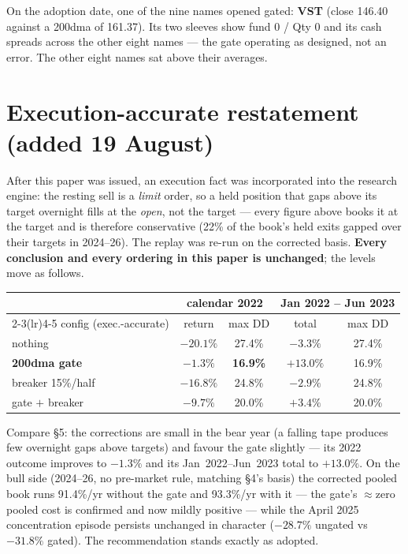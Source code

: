\documentclass[11pt,a4paper]{article}
\newcommand{\tabnote}[1]{\begin{center}\begin{minipage}{0.92\textwidth}
  \footnotesize\color{bcgrey}#1\end{minipage}\end{center}}
\newcommand{\good}[1]{{\color{bcteal}\textbf{#1}}}
\begin{document}
On the adoption date, one of the nine names opened gated: \textbf{VST} (close
146.40 against a 200dma of 161.37). Its two sleeves show fund 0 / Qty 0 and its
cash spreads across the other eight names --- the gate operating as designed, not
an error. The other eight names sat above their averages.

\section{Execution-accurate restatement (added 19 August)}

After this paper was issued, an execution fact was incorporated into the
research engine: the resting sell is a \emph{limit} order, so a held position
that gaps above its target overnight fills at the \emph{open}, not the target
--- every figure above books it at the target and is therefore conservative
(22\% of the book's held exits gapped over their targets in 2024--26). The
replay was re-run on the corrected basis. \textbf{Every conclusion and every
ordering in this paper is unchanged}; the levels move as follows.

\begin{center}
\begin{tabular}{lcccc}
\toprule
 & \multicolumn{2}{c}{calendar 2022} & \multicolumn{2}{c}{Jan 2022 -- Jun 2023} \\
\cmidrule(lr){2-3}\cmidrule(lr){4-5}
config (exec.-accurate) & return & max DD & total & max DD \\
\midrule
nothing            & $-20.1\%$ & 27.4\% & $-3.3\%$  & 27.4\% \\
\textbf{200dma gate} & \good{$-1.3\%$} & \good{16.9\%} & \good{$+13.0\%$} & 16.9\% \\
breaker 15\%/half  & $-16.8\%$ & 24.8\% & $-2.9\%$  & 24.8\% \\
gate $+$ breaker   & $-9.7\%$  & 20.0\% & $+3.4\%$  & 20.0\% \\
\bottomrule
\end{tabular}
\end{center}

\tabnote{Compare \S5: the corrections are small in the bear year (a falling
tape produces few overnight gaps above targets) and favour the gate slightly
--- its 2022 outcome improves to $-1.3\%$ and its Jan~2022--Jun~2023 total to
$+13.0\%$. On the bull side (2024--26, no pre-market rule, matching \S4's
basis) the corrected pooled book runs 91.4\%/yr without the gate and
93.3\%/yr with it --- the gate's $\approx$zero pooled cost is confirmed and
now mildly positive --- while the April 2025 concentration episode persists
unchanged in character ($-28.7\%$ ungated vs $-31.8\%$ gated). The
recommendation stands exactly as adopted.}
\end{document}
